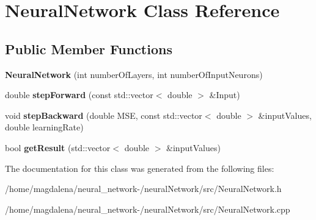 \hypertarget{classNeuralNetwork}{}\section{Neural\+Network Class Reference}
\label{classNeuralNetwork}
\subsection*{Public Member Functions}
\begin{DoxyCompactItemize}
\item 
\mbox{\label{classNeuralNetwork_a7181c2cefc064a45571bb456c4a8f862}} 
{\bfseries Neural\+Network} (int number\+Of\+Layers, int number\+Of\+Input\+Neurons)
\item 
\mbox{\label{classNeuralNetwork_a76b4eda80a260d3a712bab64033e022d}} 
double {\bfseries step\+Forward} (const std\+::vector$<$ double $>$ \&Input)
\item 
\mbox{\label{classNeuralNetwork_addb381671a94934b406cc015328f9867}} 
void {\bfseries step\+Backward} (double M\+SE, const std\+::vector$<$ double $>$ \&input\+Values, double learning\+Rate)
\item 
\mbox{\label{classNeuralNetwork_a7f87c803cd82de8c9ac626e6b9356fa3}} 
bool {\bfseries get\+Result} (std\+::vector$<$ double $>$ \&input\+Values)
\end{DoxyCompactItemize}


The documentation for this class was generated from the following files\+:\begin{DoxyCompactItemize}
\item 
/home/magdalena/neural\+\_\+network-\//neural\+Network/src/Neural\+Network.\+h\item 
/home/magdalena/neural\+\_\+network-\//neural\+Network/src/Neural\+Network.\+cpp\end{DoxyCompactItemize}
